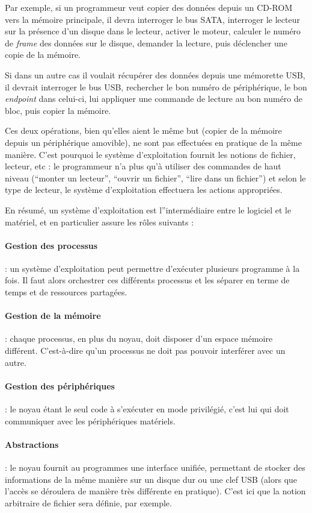 Par exemple, si un programmeur veut copier des données depuis un CD-ROM vers la
mémoire principale, il devra interroger le bus SATA, interroger le lecteur sur
la présence d'un disque dans le lecteur, activer le moteur, calculer le numéro
de \emph{frame} des données sur le disque, demander la lecture, puis déclencher
une copie de la mémoire.

Si dans un autre cas il voulait récupérer des données depuis une mémorette USB,
il devrait interroger le bus USB, rechercher le bon numéro de périphérique, le
bon \emph{endpoint} dans celui-ci, lui appliquer une commande de lecture au bon
numéro de bloc, puis copier la mémoire.

Ces deux opérations, bien qu'elles aient le même but (copier de la mémoire
depuis un périphérique amovible), ne sont pas effectuées en pratique de la même
manière. C'est pourquoi le système d'exploitation fournit les notions de
fichier, lecteur, etc : le programmeur n'a plus qu'à utiliser des commandes de
haut niveau (``monter un lecteur'', ``ouvrir un fichier'', ``lire dans un
fichier'') et selon le type de lecteur, le système d'exploitation effectuera les
actions appropriées.

En résumé, un système d'exploitation est l''intermédiaire entre le logiciel et
le matériel, et en particulier assure les rôles suivants :

\paragraph{Gestion des processus} : un système d'exploitation peut permettre
d'exécuter plusieurs programme à la fois. Il faut alors orchestrer ces
différents processus et les séparer en terme de temps et de ressources
partagées.

\paragraph{Gestion de la mémoire} : chaque processus, en plus du noyau, doit
disposer d'un espace mémoire différent. C'est-à-dire qu'un processus ne doit pas
pouvoir interférer avec un autre.

\paragraph{Gestion des périphériques} : le noyau étant le seul code à s'exécuter
en mode privilégié, c'est lui qui doit communiquer avec les périphériques
matériels.

\paragraph{Abstractions} : le noyau fournit au programmes une interface unifiée,
permettant de stocker des informations de la même manière sur un disque dur ou
une clef USB (alors que l'accès se déroulera de manière très différente en
pratique). C'est ici que la notion arbitraire de fichier sera définie, par
exemple.

